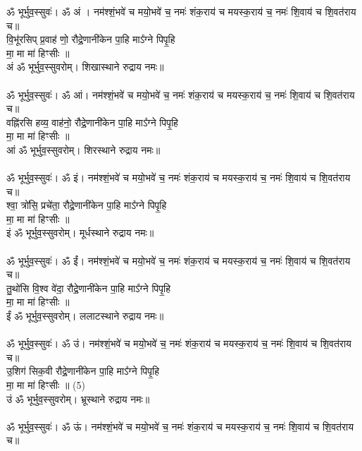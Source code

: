 \subsection{}\\
{\small ॐ भूर्भुव॒स्सुवः॑। ॐ अं । नम॑श्शं॒भवे॑ च मयो॒भवे॑ च॒ नमः॑ शंक॒राय॑ च मयस्क॒राय॑ च॒ नमः॑ शि॒वाय॑ च शि॒वत॑राय च॥}\\
वि॒भू॑रसिप् प्र॒वाह॑ णो॒ रौद्रे॒णानी॑केन पा॒हि माऽ᳚ग्ने पिपृ॒हि\\
मा॒ मा मा॑ हिꣳसीः ॥\\
{\small अं ॐ भूर्भुव॒स्सुवरोम्। शिखास्थाने रुद्राय नमः॥}\\
\\
{\small ॐ भूर्भुव॒स्सुवः॑। ॐ आं। नम॑श्शं॒भवे॑ च मयो॒भवे॑ च॒ नमः॑ शंक॒राय॑ च मयस्क॒राय॑ च॒ नमः॑ शि॒वाय॑ च शि॒वत॑राय च॥}\\
वह्नि॑रसि हव्य॒ वाह॑नो॒ रौद्रे॒णानी॑केन पा॒हि माऽ᳚ग्ने पिपृ॒हि\\
मा॒ मा मा॑ हिꣳसीः ॥\\
{\small आं ॐ भूर्भुव॒स्सुवरोम्। शिरस्थाने रुद्राय नमः॥}\\
\\
{\small ॐ भूर्भुव॒स्सुवः॑। ॐ इं। नम॑श्शं॒भवे॑ च मयो॒भवे॑ च॒ नमः॑ शंक॒राय॑ च मयस्क॒राय॑ च॒ नमः॑ शि॒वाय॑ च शि॒वत॑राय च॥}\\
श्वा॒ त्रो॑सि॒ प्रचे॑ता॒ रौद्रे॒णानी॑केन पा॒हि माऽ᳚ग्ने पिपृ॒हि\\
मा॒ मा मा॑ हिꣳसीः ॥\\
{\small इं ॐ भूर्भुव॒स्सुवरोम्। मूर्धस्थाने रुद्राय नमः॥}\\
\\
{\small ॐ भूर्भुव॒स्सुवः॑। ॐ ईं। नम॑श्शं॒भवे॑ च मयो॒भवे॑ च॒ नमः॑ शंक॒राय॑ च मयस्क॒राय॑ च॒ नमः॑ शि॒वाय॑ च शि॒वत॑राय च॥}\\
तु॒थो॑सि वि॒श्व वे॑दा॒ रौद्रे॒णानी॑केन पा॒हि माऽ᳚ग्ने पिपृ॒हि\\
मा॒ मा मा॑ हिꣳसीः ॥\\
{\small ईं ॐ भूर्भुव॒स्सुवरोम्। ललाटस्थाने रुद्राय नमः॥}\\
\\
{\small ॐ भूर्भुव॒स्सुवः॑। ॐ उं। नम॑श्शं॒भवे॑ च मयो॒भवे॑ च॒ नमः॑ शंक॒राय॑ च मयस्क॒राय॑ च॒ नमः॑ शि॒वाय॑ च शि॒वत॑राय च॥}\\
उ॒शिग॑ सिक॒वी रौद्रे॒णानी॑केन पा॒हि माऽ᳚ग्ने पिपृ॒हि\\
मा॒ मा मा॑ हिꣳसीः ॥  (5)\\
{\small उं ॐ भूर्भुव॒स्सुवरोम्। भ्रूस्थाने रुद्राय नमः॥}\\
\\
{\small ॐ भूर्भुव॒स्सुवः॑। ॐ ऊं। नम॑श्शं॒भवे॑ च मयो॒भवे॑ च॒ नमः॑ शंक॒राय॑ च मयस्क॒राय॑ च॒ नमः॑ शि॒वाय॑ च शि॒वत॑राय च॥}\\
